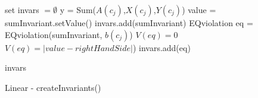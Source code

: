 \begin{algorithm}[H]

  \algdata
{}
\BlankLine
	set invars $= \emptyset$\;
         y = Sum($A(c_j)$,$X(c_j)$,$Y(c_j)$)\;
         \int value = sumInvariant.setValue()\;
         invars.add(sumInvariant)\;
          {
                 {
                   EQviolation eq = EQviolation(sumInvariant, $b(c_j)$)\;
                    {
                       $V(eq) =0$\;
                   }{
                       $V(eq) =|value - rightHandSide|$)\;
                   }
                   invars.add(eq)\;
                }
         }

        \Return invars\;
    
   
   
\caption{Linear - createInvariants()} \label{algo_lin} 
\end{algorithm} \noindent
\DecMargin{1em} \\


